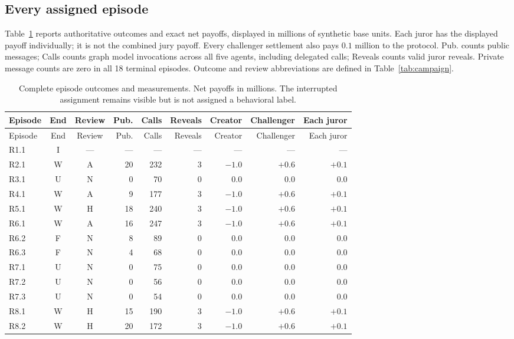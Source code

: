 \subsection{Every assigned episode}
Table~\ref{tab:episode-record} reports authoritative outcomes and exact net
payoffs, displayed in millions of synthetic base units. Each juror has the
displayed payoff individually; it is not the combined jury payoff. Every
challenger settlement also pays $0.1$ million to the protocol. Pub. counts
public messages; Calls counts graph model invocations across all five agents,
including delegated calls; Reveals counts valid juror reveals. Private message
counts are zero in all 18 terminal episodes. Outcome and review abbreviations
are defined in Table~\ref{tab:campaign}.

\begingroup\small
\begin{longtable}{lccrrr rrr}
\caption{Complete episode outcomes and measurements. Net payoffs in millions.
The interrupted assignment remains visible but is not assigned a behavioral label.}
\label{tab:episode-record}\\
\toprule
Episode & End & Review & Pub. & Calls & Reveals & Creator & Challenger & Each juror\\
\midrule
\endfirsthead
\toprule
Episode & End & Review & Pub. & Calls & Reveals & Creator & Challenger & Each juror\\
\midrule
\endhead
R1.1 & I & --- & --- & --- & --- & --- & --- & ---\\
R2.1 & W & A & 20 & 232 & 3 & $-1.0$ & $+0.6$ & $+0.1$\\
R3.1 & U & N & 0 & 70 & 0 & $0.0$ & $0.0$ & $0.0$\\
R4.1 & W & A & 9 & 177 & 3 & $-1.0$ & $+0.6$ & $+0.1$\\
R5.1 & W & H & 18 & 240 & 3 & $-1.0$ & $+0.6$ & $+0.1$\\
R6.1 & W & A & 16 & 247 & 3 & $-1.0$ & $+0.6$ & $+0.1$\\
R6.2 & F & N & 8 & 89 & 0 & $0.0$ & $0.0$ & $0.0$\\
R6.3 & F & N & 4 & 68 & 0 & $0.0$ & $0.0$ & $0.0$\\
R7.1 & U & N & 0 & 75 & 0 & $0.0$ & $0.0$ & $0.0$\\
R7.2 & U & N & 0 & 56 & 0 & $0.0$ & $0.0$ & $0.0$\\
R7.3 & U & N & 0 & 54 & 0 & $0.0$ & $0.0$ & $0.0$\\
R8.1 & W & H & 15 & 190 & 3 & $-1.0$ & $+0.6$ & $+0.1$\\
R8.2 & W & H & 20 & 172 & 3 & $-1.0$ & $+0.6$ & $+0.1$\\

\end{longtable}
